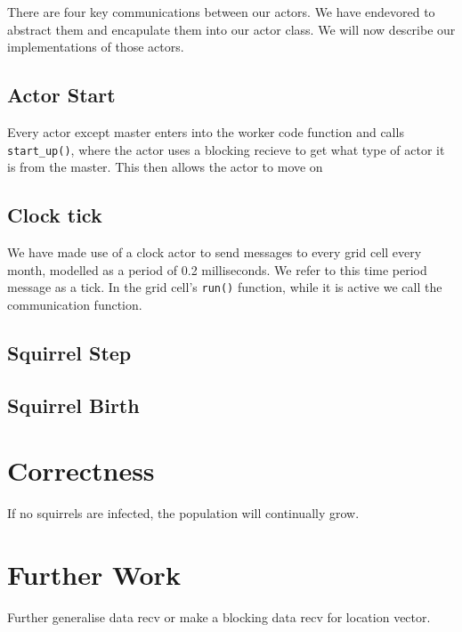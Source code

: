 \documentclass[oneside]{article}
\begin{document}
 There are four key communications between our actors. We have endevored to abstract them and encapulate them into our actor class. We will now describe our implementations of those actors.

 \subsection{Actor Start}
 Every actor except master enters into the worker code function and calls \texttt{start\_up()}, where the actor uses a blocking recieve to get what type of actor it is from the master. This then allows the actor to move on 

\subsection{Clock tick}
We have made use of a clock actor to send messages to every grid cell every month, modelled as a period of 0.2 milliseconds. We refer to this time period message as a tick. In the grid cell's \texttt{run()} function, while it is active we call the communication function.

\subsection{Squirrel Step}

\subsection{Squirrel Birth}


\section{Correctness}\label{sec:cor}
If no squirrels are infected, the population will continually grow.

\section{Further Work}\label{sec:fur}
Further generalise data recv or make a blocking data recv for location vector.
\end{document}
